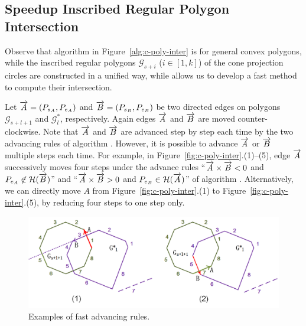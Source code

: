 \subsection{Speedup Inscribed Regular Polygon Intersection}
\label{subsec-fastRPI}


Observe that algorithm \cpia in Figure~\ref{alg:c-poly-inter} is for general convex polygons,
while the inscribed regular polygons $\mathcal{G}_{s+i}$ ($i\in[1, k]$) of the cone projection circles are constructed in a unified way,
while allows us to develop a fast method to compute their intersection.

Let $\protect\overrightarrow{A} = (P_{s_A}, P_{e_A})$ and $\protect\overrightarrow{B} = (P_{s_B}, P_{e_B})$  be two directed edges on polygons $\mathcal{G}_{s+l+1}$ and $\mathcal{G}^*_{l}$, respectively.
Again edges $\protect\overrightarrow{A}$ and $\protect\overrightarrow{B}$ are moved counter-clockwise. Note that $\protect\overrightarrow{A}$ and $\protect\overrightarrow{B}$ are advanced step by step each time by the two advancing rules of algorithm \cpia.
%
However, it is possible to advance $\protect\overrightarrow{A}$ or $\protect\overrightarrow{B}$ multiple steps each time.
%
For example, in Figure~\ref{fig:c-poly-inter}.(1)--(5), edge $\protect\overrightarrow{A}$ successively moves four steps under the advance rules ``$\protect\overrightarrow{A} \times \protect\overrightarrow{B} < 0$ and $P_{e_A} \not \in \mathcal{H}(\protect\overrightarrow{B})$'' and ``$\protect\overrightarrow{A} \times \protect\overrightarrow{B} > 0$ and $P_{e_B} \in \mathcal{H}(\protect\overrightarrow{A})$'' of algorithm \cpia.
Alternatively, we can directly move $A$ from Figure~\ref{fig:c-poly-inter}.(1) to Figure~\ref{fig:c-poly-inter}.(5), by reducing four steps to one step only.

\begin{figure}[tb!]
\centering
\includegraphics[scale=0.86]{figures/Fig-r-poly-rule1.png}
\vspace{-5ex}
\caption{\small Examples of fast advancing rules.}
\vspace{-3ex}
\label{fig:r-poly-rule1}
\end{figure}



